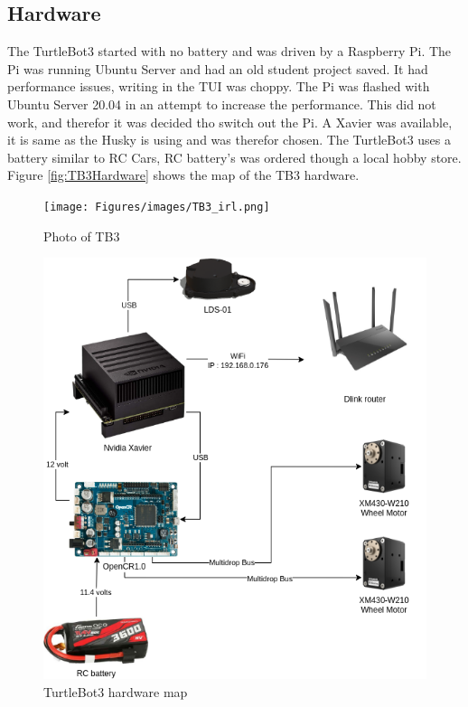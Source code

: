 \subsection{Hardware}
The TurtleBot3 started with no battery and was driven by a Raspberry Pi. The Pi was running Ubuntu Server and had an old student project saved. It had performance issues, writing in the TUI was choppy. The Pi was flashed with Ubuntu Server 20.04 in an attempt to increase the performance. This did not work, and therefor it was decided tho switch out the Pi. A Xavier was available, it is same as the Husky is using and was therefor chosen. The TurtleBot3 uses a battery similar to RC Cars, RC battery's was ordered though a local hobby store. Figure \ref{fig:TB3Hardware} shows the map of the TB3 hardware. 

\begin{figure}[H]
  \centering
  \begin{minipage}[b]{0.4\textwidth}
    \texttt{[image: Figures/images/TB3\_irl.png]}
    \caption{Photo of TB3}
    \label{fig:TB3_irl}
  \end{minipage}
  \hfill
  \begin{minipage}[b]{0.59\textwidth}
    \includegraphics[width=\textwidth]{Figures/drawio/TB_HW.drawio.png}
    \caption{TurtleBot3 hardware map}
    \label{fig:TB3HW}
  \end{minipage}
\end{figure}


